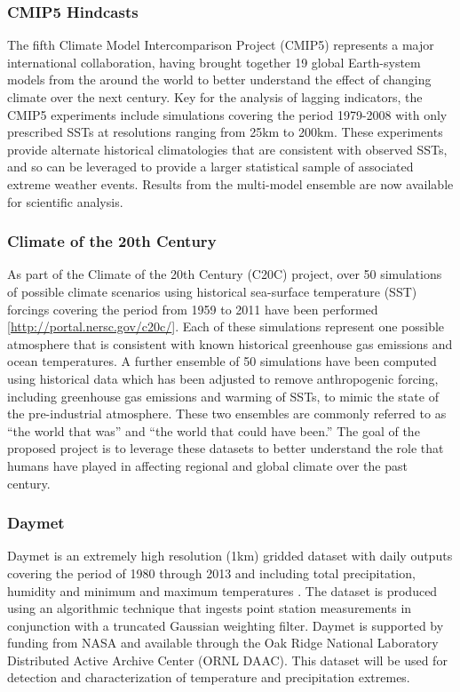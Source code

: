 \documentclass[11pt]{article}
\newcommand\citep{\cite}
\begin{document}
\subsubsection*{CMIP5 Hindcasts} \label{sec:CMIP5}

The fifth Climate Model Intercomparison Project (CMIP5) represents a major international collaboration, having brought together 19 global Earth-system models from the around the world to better understand the effect of changing climate over the next century.  Key for the analysis of lagging indicators, the CMIP5 experiments include simulations covering the period 1979-2008 with only prescribed SSTs at resolutions ranging from 25km to 200km.  These experiments provide alternate historical climatologies that are consistent with observed SSTs, and so can be leveraged to provide a larger statistical sample of associated extreme weather events.  Results from the multi-model ensemble are now available for scientific analysis.

\subsubsection*{Climate of the 20th Century} \label{sec:EnsembleData}

As part of the Climate of the 20th Century (C20C) project, over 50 simulations of possible climate scenarios using historical sea-surface temperature (SST) forcings covering the period from 1959 to 2011 have been performed [\url{http://portal.nersc.gov/c20c/}].  Each of these simulations represent one possible atmosphere that is consistent with known historical greenhouse gas emissions and ocean temperatures.  A further ensemble of 50 simulations have been computed using historical data which has been adjusted to remove anthropogenic forcing, including greenhouse gas emissions and warming of SSTs, to mimic the state of the pre-industrial atmosphere.  These two ensembles are commonly referred to as ``the world that was'' and ``the world that could have been.''  The goal of the proposed project is to leverage these datasets to better understand the role that humans have played in affecting regional and global climate over the past century.

\subsubsection*{Daymet} \label{sec:DAYMET}

Daymet is an extremely high resolution (1km) gridded dataset with daily outputs covering the period of 1980 through 2013 and including total precipitation, humidity and minimum and maximum temperatures \citep{thornton1997generating, thornton1999improved, thornton2000simultaneous}.  The dataset is produced using an algorithmic technique that ingests point station measurements in conjunction with a truncated Gaussian weighting filter.  Daymet is supported by funding from NASA and available through the Oak Ridge National Laboratory Distributed Active Archive Center (ORNL DAAC).  This dataset will be used for detection and characterization of temperature and precipitation extremes.
\end{document}
